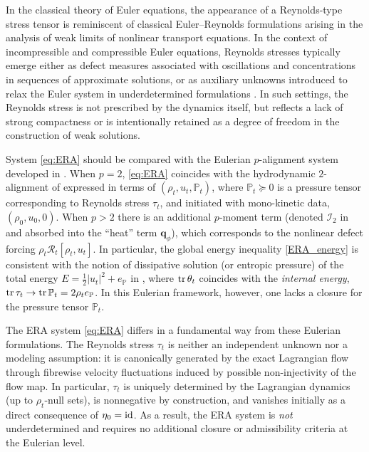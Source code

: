\documentclass[10pt,reqno]{amsart}
\numberwithin{equation}{section}
\newcommand{\calI}{\mathcal I}
\newcommand{\calR}{\mathcal R}
\begin{document}
In the classical theory of Euler equations, the appearance of a Reynolds-type stress tensor is reminiscent of classical Euler--Reynolds formulations arising in the analysis of weak limits of nonlinear transport equations. In the context of incompressible and compressible Euler equations, Reynolds stresses typically emerge either as defect measures associated with oscillations and
concentrations in sequences of approximate solutions, or as auxiliary unknowns introduced to relax the Euler system in underdetermined formulations \cite{BDIS15, DS13, DS14, DiP85, LPT94}.
In such settings, the Reynolds stress is not prescribed by the dynamics itself, but reflects a lack of strong compactness or is intentionally retained as a degree of freedom in the construction of weak solutions.

System \eqref{eq:ERA} should be compared with the Eulerian $p$-alignment system  developed in \cite{Tad23}. When $p=2$, \eqref{eq:ERA} coincides with the hydrodynamic $2$-alignment of \cite{Tad23}
expressed in terms of  $(\rho_t,u_t,{\mathbb P}_t)$,
 where ${\mathbb P}_t\succeq 0$  is a pressure tensor corresponding to Reynolds stress $\tau_t$, and initiated with mono-kinetic data, $(\rho_0,u_0,0)$. When $p>2$ there is an additional $p$-moment term (denoted ${\calI}_2$ in \cite[eq. (A.10)]{Tad23} and absorbed into the ``heat'' term ${\mathbf q}_\phi$), which corresponds to the nonlinear defect forcing $\rho_t{\calR}_t[\rho_t,u_t]$. In particular, the global energy inequality \eqref{ERA_energy} is consistent with the notion of dissipative solution (or entropic pressure) of the total energy $E=\frac{1}{2}|u_t|^2 + e_{{\mathbb P}}$ in \cite[eq. (1.12)]{Tad23}, where ${\rm tr}\,\theta_t$ coincides with the \emph{internal energy}, $ {\rm tr}\,\tau_t \rightarrow {\rm tr}\,{\mathbb P}_t =2\rho_t e_{{\mathbb P}}$.
 In this Eulerian framework, however, one lacks a closure for the pressure tensor ${\mathbb P}_t$.   

The ERA system \eqref{eq:ERA} differs in a fundamental way from these Eulerian formulations. The Reynolds stress $\tau_t$ is neither an independent unknown nor a modeling assumption: it is canonically generated by the exact Lagrangian flow through fibrewise velocity fluctuations induced by possible non-injectivity of the flow map. In particular, $\tau_t$ is uniquely determined by the Lagrangian dynamics (up to $\rho_t$-null sets), is nonnegative by construction, and vanishes initially as a direct consequence of $\eta_0={\rm id}$. As a result, the ERA system is \emph{not} underdetermined and requires no additional closure or admissibility criteria at the Eulerian level.  
\end{document}
